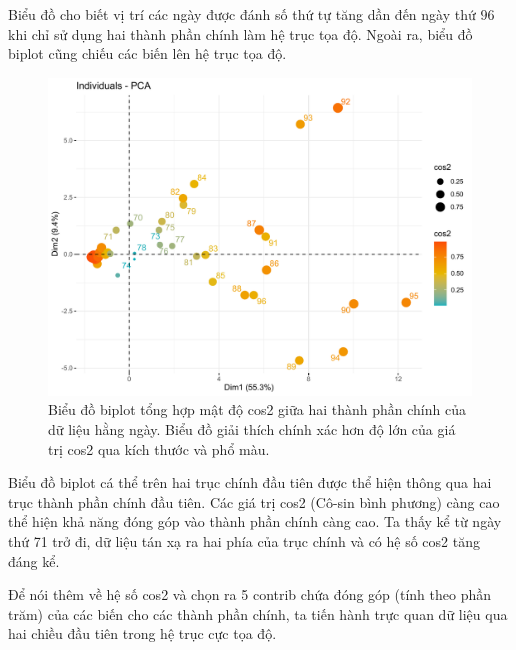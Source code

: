 \documentclass[../thesis.tex]{subfiles}
\begin{document}
Biểu đồ cho biết vị trí các ngày được đánh số thứ tự tăng dần đến ngày thứ $ 96 $ khi chỉ sử dụng hai thành phần chính làm hệ trục tọa độ. Ngoài ra, biểu đồ biplot cũng chiếu các biến lên hệ trục tọa độ. 




\begin{Shaded}
	\begin{Highlighting}[]
\SpecialCharTok{\%\textgreater{}\%} 
		 \NormalTok{,}
		 \NormalTok{,}
		 \NormalTok{(}\NormalTok{, }\NormalTok{, }\NormalTok{),}
		 \NormalTok{) }
	\end{Highlighting}
\end{Shaded}


\begin{figure}[H]
	\centering
	\includegraphics[width=0.7 \linewidth]{images/ind_case}
	\caption[Biểu đồ biplot tổng hợp mật độ cos2 giữa hai thành phần chính của dữ liệu hằng ngày]{Biểu đồ biplot tổng hợp mật độ cos2 giữa hai thành phần chính của dữ liệu hằng ngày. Biểu đồ giải thích chính xác hơn độ lớn của giá trị cos2 qua kích thước và phổ màu.}
	\label{fig:indcase}
\end{figure}


Biểu đồ biplot cá thể trên hai trục chính đầu tiên được thể hiện thông qua hai trục thành phần chính đầu tiên. Các giá trị cos2 (Cô-sin bình phương) càng cao thể hiện khả năng đóng góp vào thành phần chính càng cao. Ta thấy kể từ ngày thứ 71 trở đi, dữ liệu tán xạ ra hai phía của trục chính và có hệ số cos2 tăng đáng kể.

Để nói thêm về hệ số cos2 và chọn ra 5 contrib chứa đóng góp (tính theo phần trăm) của các biến cho các thành phần chính, ta tiến hành trực quan dữ liệu qua hai chiều đầu tiên trong hệ trục cực tọa độ.
\end{document}
